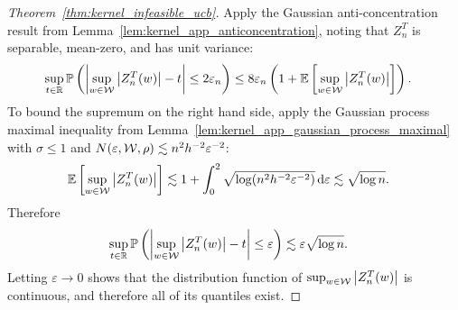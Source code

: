 \begin{proof}[Theorem~\ref{thm:kernel_infeasible_ucb}]
  Apply the Gaussian anti-concentration
  result from Lemma~\ref{lem:kernel_app_anticoncentration},
  noting that $Z_n^T$ is separable,
  mean-zero, and has unit variance:
  \begin{align*}
    \sup_{t \in \mathbb{R}}
    \mathbb{P}\left(
      \left|
      \sup_{w \in \mathcal{W}}
      \big| Z_n^T(w) \big|
      - t
      \right|
      \leq 2\varepsilon_n
    \right)
    &\leq
    8 \varepsilon_n
    \left(
      1 + \mathbb{E}\left[
        \sup_{w \in \mathcal{W}}
        \big| Z_n^T(w) \big|
      \right]
    \right).
  \end{align*}
  To bound the supremum on the right hand side,
  apply the Gaussian process maximal inequality from
  Lemma~\ref{lem:kernel_app_gaussian_process_maximal}
  with
  $\sigma \leq 1$ and
  $N(\varepsilon, \mathcal{W}, \rho) \lesssim n^2 h^{-2} \varepsilon^{-2}$:
  \begin{align*}
    \mathbb{E}\left[
      \sup_{w \in \mathcal{W}}
      \big|Z_n^T(w)\big|
    \right]
    &\lesssim
    1
    + \int_0^{2}
    \sqrt{\log (n^2 h^{-2} \varepsilon^{-2})}
    \,\mathrm{d}\varepsilon
    \lesssim
    \sqrt{\log n}.
  \end{align*}
  Therefore
  \begin{align*}
    \sup_{t \in \mathbb{R}}
    \mathbb{P}\left(
      \left|
      \sup_{w \in \mathcal{W}}
      \big| Z_n^T(w) \big|
      - t
      \right|
      \leq \varepsilon
    \right)
    &\lesssim
    \varepsilon
    \sqrt{\log n}.
  \end{align*}
  Letting $\varepsilon \to 0$
  shows that the distribution function of
  $\sup_{w \in \mathcal{W}} \big|Z_n^T(w)\big|$
  is continuous,
  and therefore all of its quantiles exist.



\end{proof}
